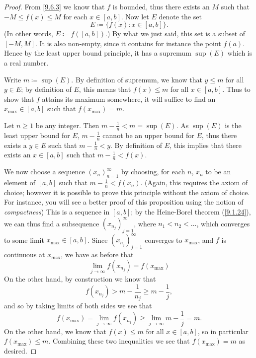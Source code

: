 \begin{proof}
  From \cref{9.6.3} we know that \(f\) is bounded, thus there exists an \(M\) such that \(-M \leq f(x) \leq M\) for each \(x \in [a, b]\).
  Now let \(E\) denote the
  set
  \[
    E \coloneqq \{f(x) : x \in [a, b]\}.
  \]
  (In other words, \(E \coloneqq f([a, b])\).)
  By what we just said, this set is a subset of \([-M, M]\).
  It is also non-empty, since it contains for instance the point \(f(a)\).
  Hence by the least upper bound principle, it has a supremum \(\sup(E)\) which is a real number.

  Write \(m \coloneqq \sup(E)\).
  By definition of supremum, we know that \(y \leq m\) for all \(y \in E\);
  by definition of \(E\), this means that \(f(x) \leq m\) for all \(x \in [a, b]\).
  Thus to show that \(f\) attains its maximum somewhere, it will suffice to find an \(x_{\max} \in [a, b]\) such that \(f(x_{\max}) = m\).

  Let \(n \geq 1\) be any integer.
  Then \(m - \frac{1}{n} < m = \sup(E)\).
  As \(\sup(E)\) is the least upper bound for \(E\), \(m - \frac{1}{n}\) cannot be an upper bound for \(E\), thus there exists a \(y \in E\) such that \(m - \frac{1}{n} < y\).
  By definition of \(E\), this implies that there exists an \(x \in [a, b]\) such that \(m - \frac{1}{n} < f(x)\).

  We now choose a sequence \((x_n)_{n = 1}^\infty\) by choosing, for each \(n\), \(x_n\) to be an element of \([a, b]\) such that \(m - \frac{1}{n} < f(x_n)\).
  (Again, this requires the axiom of choice;
  however it is possible to prove this principle without the axiom of choice.
  For instance, you will see a better proof of this proposition using the notion of \emph{compactness})
  This is a sequence in \([a, b]\);
  by the Heine-Borel theorem (\cref{9.1.24}), we can thus find a subsequence \((x_{n_j})_{j = 1}^\infty\), where \(n_1 < n_2 < \dots\), which converges to some limit \(x_{\max} \in [a, b]\).
  Since \((x_{n_j})_{j = 1}^\infty\) converges to \(x_{\max}\), and \(f\) is continuous at \(x_{\max}\), we have as before that
  \[
    \lim_{j \to \infty} f(x_{n_j}) = f(x_{\max})
  \]
  On the other hand, by construction we know that
  \[
    f(x_{n_j}) > m - \frac{1}{n_j} \geq m - \frac{1}{j},
  \]
  and so by taking limits of both sides we see that
  \[
    f(x_{\max}) = \lim_{j \to \infty} f(x_{n_j}) \geq \lim_{j \to \infty} m - \frac{1}{j} = m.
  \]
  On the other hand, we know that \(f(x) \leq m\) for all \(x \in [a, b]\), so in particular \(f(x_{\max}) \leq m\).
  Combining these two inequalities we see that \(f(x_{\max}) = m\) as desired.


\end{proof}
